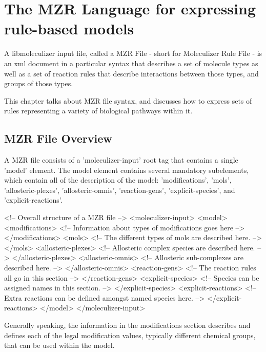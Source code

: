 \chapter{The MZR Language for expressing rule-based models}
\label{chap:theRulesChapter}

A libmoleculizer input file, called a MZR File - short for Moleculizer
Rule File - is an xml document in a particular syntax that describes a
set of molecule types as well as a set of reaction rules
that describe interactions between those types, and groups of those types.

This chapter talks about MZR file syntax, and discusses how to express
sets of rules representing a variety of biological pathways within it.

\section{MZR File Overview}

A MZR file consists of a 'moleculizer-input' root tag that contains a
single 'model' element.  The model element contains several mandatory
subelements, which contain all of the description of the model:
'modifications', 'mols', 'allosteric-plexes', 'allosteric-omnis',
'reaction-gens', 'explicit-species', and 'explicit-reactions'. 

\begin{ExampleXML}[caption=The overall structure of a MZR file, label=overallmzrstruct]
<!-- Overall structure of a MZR file -->
<moleculizer-input>
  <model>
    <modifications>
       <!-- Information about types of modifications goes here -->
    </modifications>
    <mols>
       <!-- The different types of mols are described here. -->
    </mols>
    <allosteric-plexes>
       <!-- Allosteric complex species are described here. -->
    </allosteric-plexes>
    <allosteric-omnis>
       <!-- Allosteric sub-complexes are described here. -->
    </allosteric-omnis>
    <reaction-gens>
       <!-- The reaction rules all go in this section -->
    </reaction-gens>
    <explicit-species>
       <!-- Species can be assigned names in this section. -->
    </explicit-species>
    <explicit-reactions>
       <!-- Extra reactions can be defined amongst named species here. -->
    </explicit-reactions>
  </model>
</moleculizer-input>
\end{ExampleXML}

Generally speaking, the information in the modifications section
describes and defines each of the legal modification values, typically
different chemical groups, that can be used within the model.  


